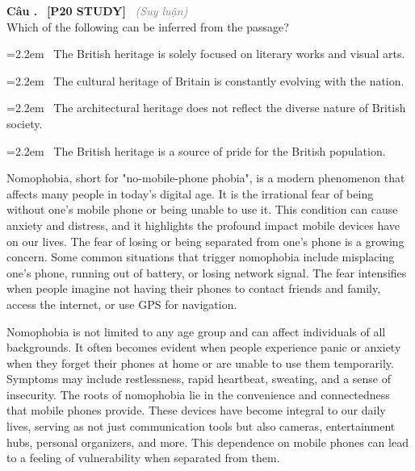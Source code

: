 \documentclass[12pt,a4paper,twoside]{article}
\newcounter{qcounter}
\newcommand{\question}[2][]{%
    \stepcounter{qcounter}%
    \par\vspace{6pt}%
    \noindent\textcolor{primaryBlue}{\textbf{Câu \theqcounter.}}~%
    \textcolor{secondaryBlue}{\small\textbf{[P20 STUDY]}}~%
    \if\relax\detokenize{#1}\relax\else\textcolor{gray}{\small\textit{(#1)}}~\fi\\[1pt]
    \noindent #2%
}
\newcommand{\choiceitem}[2]{%
    \tikz[baseline=-0.5ex]{%
        \node[draw=primaryBlue, circle, minimum size=1.5em, inner sep=0pt, thick] {\textbf{#1}};%
    }~#2%
}
\newenvironment{readingpassage}[1][]{%
    \begin{tcolorbox}[enhanced, colback=grayLight, colframe=secondaryBlue,
        coltitle=textDark, fonttitle=\bfseries, title={#1},
        rounded corners, arc=3mm, boxrule=1pt,
        left=15pt, right=15pt, top=10pt, bottom=10pt,
        breakable, before skip=10pt, after skip=10pt, drop fuzzy shadow]
    \setstretch{1.3}
}{\end{tcolorbox}}
\begin{document}
\question[Suy luận]{Which of the following can be inferred from the passage?}

\par\vspace{4pt}
\noindent\hangindent=2.2em\choiceitem{A}{The British heritage is solely focused on literary works and visual arts.}\par\vspace{4pt}
\noindent\hangindent=2.2em\choiceitem{B}{The cultural heritage of Britain is constantly evolving with the nation.}\par\vspace{4pt}
\noindent\hangindent=2.2em\choiceitem{C}{The architectural heritage does not reflect the diverse nature of British society.}\par\vspace{4pt}
\noindent\hangindent=2.2em\choiceitem{D}{The British heritage is a source of pride for the British population.}\par\vspace{4pt}

\begin{readingpassage}[]
Nomophobia, short for "no-mobile-phone phobia", is a modern phenomenon that affects many people in today's digital age. It is the irrational fear of being without one's mobile phone or being unable to use it. This condition can cause anxiety and distress, and it highlights the profound impact mobile devices have on our lives. The fear of losing or being separated from one's phone is a growing concern. Some common situations that trigger nomophobia include misplacing one's phone, running out of battery, or losing network signal. The fear intensifies when people imagine not having their phones to contact friends and family, access the internet, or use GPS for navigation.

Nomophobia is not limited to any age group and can affect individuals of all backgrounds. It often becomes evident when people experience panic or anxiety when they forget their phones at home or are unable to use them temporarily. Symptoms may include restlessness, rapid heartbeat, sweating, and a sense of insecurity. The roots of nomophobia lie in the convenience and connectedness that mobile phones provide. These devices have become integral to our daily lives, serving as not just communication tools but also cameras, entertainment hubs, personal organizers, and more. This dependence on mobile phones can lead to a feeling of vulnerability when separated from them.
\end{readingpassage}
\end{document}
